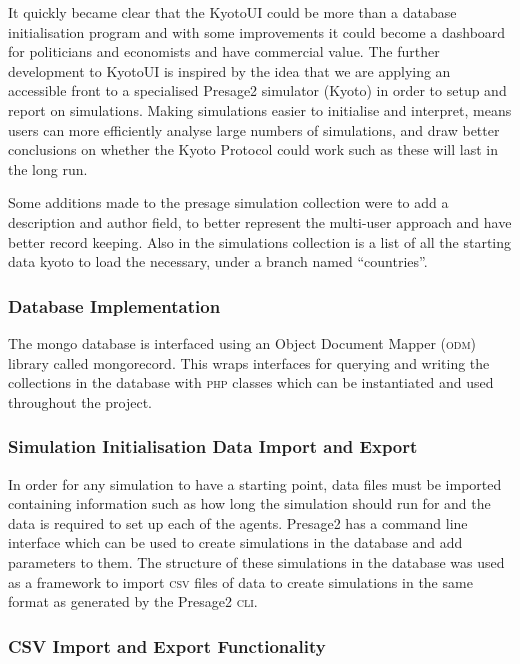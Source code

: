 It quickly became clear that the KyotoUI could be more than a database initialisation program and with some improvements it could become a dashboard for politicians and economists and have commercial value. The further development to KyotoUI is inspired by the idea that we are applying an accessible front to a specialised Presage2 simulator (Kyoto) in order to setup and report on simulations. Making simulations easier to initialise and interpret, means users can more efficiently analyse large numbers of simulations, and draw better conclusions on whether the Kyoto Protocol could work such as these will last in the long run.

Some additions made to the presage simulation collection were to add a description and author field, to better represent the multi-user approach and have better record keeping. Also in the simulations collection is a list of all the starting data kyoto to load the necessary, under a branch named “countries”.

\subsubsection{Database Implementation}

The mongo database is interfaced using an Object Document Mapper (\textsc{odm}) library called mongorecord. This wraps interfaces for querying and writing the collections in the database with \textsc{php} classes which can be instantiated and used throughout the project.

\subsubsection{Simulation Initialisation Data Import and Export}

In order for any simulation to have a starting point, data files must be imported containing information such as how long the simulation should run for and the data is required to set up each of the agents. Presage2 has a command line interface which can be used to create simulations in the database and add parameters to them. The structure of these simulations in the database was used as a framework to import \textsc{csv} files of data to create simulations in the same format as generated by the Presage2 \textsc{cli}.

\subsubsection{CSV Import and Export Functionality}

